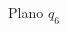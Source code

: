 \documentclass[a4paper,12pt]{article}
\begin{document}
\begin{figure}[H]
    \centering
    \begin{adjustbox}{max width=\columnwidth}
    \end{adjustbox}
    \caption{Plano $q_{6}$}
    \label{plano q6}
\end{figure}



\end{document}
